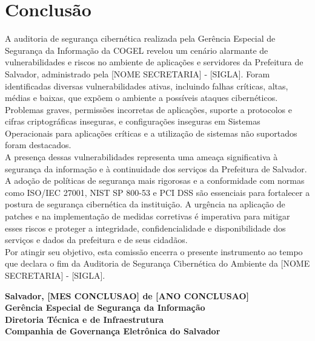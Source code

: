 \documentclass[a4paper,12pt]{article}
\begin{document}
\section{Conclusão}

A auditoria de segurança cibernética realizada pela Gerência Especial de Segurança da Informação da COGEL revelou um cenário alarmante de vulnerabilidades e riscos no ambiente de aplicações e servidores da Prefeitura de Salvador, administrado pela  [NOME SECRETARIA] - [SIGLA]. Foram identificadas diversas vulnerabilidades ativas, incluindo falhas críticas, altas, médias e baixas, que expõem o ambiente a possíveis ataques cibernéticos. Problemas graves, permissões incorretas de aplicações, suporte a protocolos e cifras criptográficas inseguras, e configurações inseguras em Sistemas Operacionais para aplicações críticas e a utilização de sistemas não suportados foram destacados.\\

A presença dessas vulnerabilidades representa uma ameaça significativa à segurança da informação e à continuidade dos serviços da Prefeitura de Salvador. A adoção de políticas de segurança mais rigorosas e a conformidade com normas como ISO/IEC 27001, NIST SP 800-53 e PCI DSS são essenciais para fortalecer a postura de segurança cibernética da instituição. A urgência na aplicação de patches e na implementação de medidas corretivas é imperativa para mitigar esses riscos e proteger a integridade, confidencialidade e disponibilidade dos serviços e dados da prefeitura e de seus cidadãos.\\

Por atingir seu objetivo, esta comissão encerra o presente instrumento ao tempo que declara o fim da Auditoria de Segurança Cibernética do Ambiente da [NOME SECRETARIA] - [SIGLA].

\newpage

\vspace*{\fill} %
\begin{flushright}
\textbf{Salvador, [MES CONCLUSAO] de [ANO CONCLUSAO] \\%
Gerência Especial de Segurança da Informação \\%
Diretoria Técnica e de Infraestrutura \\%
Companhia de Governança Eletrônica do Salvador}
\end{flushright}
\end{document}
